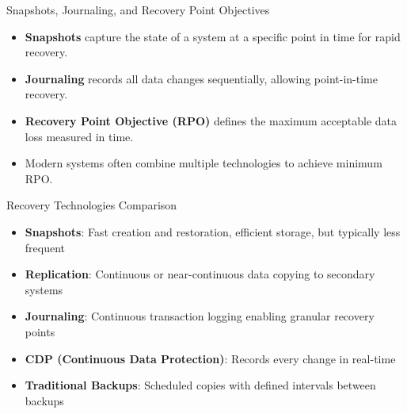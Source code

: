 \documentclass{beamer}
\begin{document}
\begin{frame}{Snapshots, Journaling, and Recovery Point Objectives}
    \begin{itemize}
        \item \textbf{Snapshots} capture the state of a system at a specific point in time for rapid recovery.
        \item \textbf{Journaling} records all data changes sequentially, allowing point-in-time recovery.
        \item \textbf{Recovery Point Objective (RPO)} defines the maximum acceptable data loss measured in time.
        \item Modern systems often combine multiple technologies to achieve minimum RPO.
    \end{itemize}
    
    \begin{block}{Recovery Technologies Comparison}
        \scriptsize
        \begin{itemize}
            \item \textbf{Snapshots}: Fast creation and restoration, efficient storage, but typically less frequent
            \item \textbf{Replication}: Continuous or near-continuous data copying to secondary systems
            \item \textbf{Journaling}: Continuous transaction logging enabling granular recovery points
            \item \textbf{CDP (Continuous Data Protection)}: Records every change in real-time
            \item \textbf{Traditional Backups}: Scheduled copies with defined intervals between backups
        \end{itemize}
    \end{block}
\end{frame}
\end{document}
